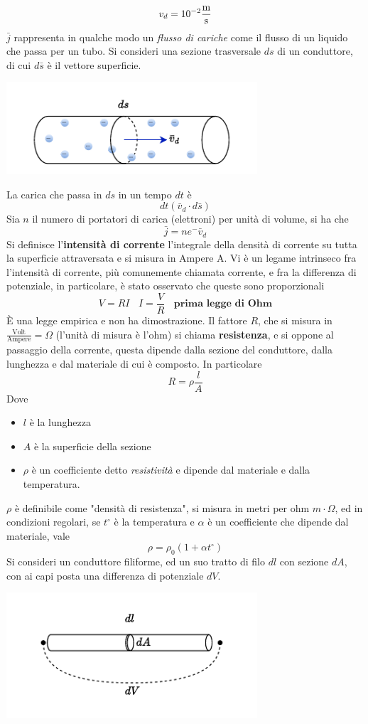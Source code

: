 \documentclass[10pt, letterpaper]{report}
\begin{document}
$$ v_d=10^{-2}\frac{\text m}{\text s}$$
$\bar j$ rappresenta in qualche modo un \textit{flusso di cariche} come il flusso di un liquido che passa per un tubo. Si consideri una sezione trasversale $ds$ di un conduttore, di cui $d\bar s$ è il vettore superficie.\begin{center}
    \includegraphics[width=0.7\textwidth]{images/correnteAttraversaSezione.drawio.pdf}
\end{center}
La carica che passa in $ds$ in un tempo $dt$ è $$dt(\bar v_d\cdot d\bar s)$$
Sia $n$ il numero di portatori di carica (elettroni) per unità di volume, si ha che 
$$ \bar j = ne^-\bar v_d$$
Si definisce l'\textbf{intensità di corrente} l'integrale della densità di corrente su tutta la superficie attraversata 
e si misura in Ampere A. \acc 
Vi è un legame intrinseco fra l'intensità di corrente, più comunemente chiamata corrente, e fra la differenza di potenziale, in particolare, è stato osservato che queste sono proporzionali 
$$ V=RI\ \ \ \ I=\frac{V}{R}\ \ \ \ \textbf{prima legge di Ohm}$$
È una legge empirica e non ha dimostrazione.
Il fattore $R$, che si misura in $\frac{\text{Volt}}{\text{Ampere}}=\Omega$ (l'unità di misura è l'ohm) si chiama \textbf{resistenza}, e si oppone al passaggio della corrente, questa dipende dalla sezione del conduttore, dalla lunghezza e dal materiale di cui è composto. In particolare 
$$ R=\rho \frac{l}{A}$$
Dove \begin{itemize}
    \item $l$ è la lunghezza 
    \item $A$ è la superficie della sezione 
    \item $\rho$ è un coefficiente detto \textit{resistività} e dipende dal materiale e dalla temperatura.
\end{itemize}
$\rho$ è definibile come "densità di resistenza", si misura in metri per ohm $m\cdot\Omega$, ed in condizioni regolari, se $t^\circ$ è la temperatura e $\alpha$ è un coefficiente che dipende dal materiale, vale 
$$ \rho=\rho_0(1+\alpha t^\circ)$$
Si consideri un conduttore filiforme, ed un suo tratto di filo $dl$ con sezione $dA$, con ai capi posta una differenza di potenziale $dV$.\begin{center}
    \includegraphics[width=0.7\textwidth]{images/tratttofilo.pdf}
\end{center}
\end{document}
